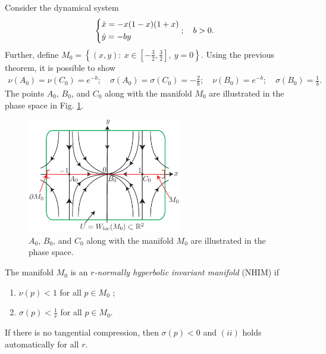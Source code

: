 \begin{ex}[]
	Consider the dynamical system
	\begin{align}
		\begin{dcases}
			\dot{x} = -x(1-x)(1+x) \\
			\dot{y} = -by
		\end{dcases}
		;\quad b>0.
	\end{align}
	Further, define $M_0 = \left\{ (x,y):\ x\in \left[ -\frac{3}{2}, \frac{3}{2}\right],\ y=0 \right\}$. Using the previous theorem, it is possible to show
	\begin{align}
		\nu (A_0) = \nu (C_0) = e^{-b}; \quad \sigma(A_0) = \sigma(C_0) = - \frac{2}{b}; \quad
		\nu (B_0) = e^{-b}; \quad \sigma(B_0) = \frac{1}{b}.
	\end{align}
	The points $A_0$, $B_0$, and $C_0$ along with the manifold $M_0$ are illustrated in the phase space in Fig. \ref{fig:fenichel_ex1}.
	\begin{figure}[h!]
		\centering
		\includegraphics[width=0.6\textwidth]{figures/ch9/14fenichel_ex1.pdf}
		\caption{$A_0$, $B_0$, and $C_0$ along with the manifold $M_0$ are illustrated in the phase space.}
		\label{fig:fenichel_ex1}
	\end{figure}
\end{ex}

\begin{definition}
	The manifold $M_0$ is an \emph{$r$-normally hyperbolic invariant manifold} (NHIM) if
	\begin{enumerate}
		\item $\nu (p)<1$ for all $p\in M_0$ ;
		\item $\sigma(p) < \frac{1}{r}$ for all $p \in M_0$.
	\end{enumerate}	
\end{definition}
\begin{remark}[]
	If there is no tangential compression, then $\sigma(p)<0$ and $(ii)$ holds automatically for all $r$.
\end{remark}

